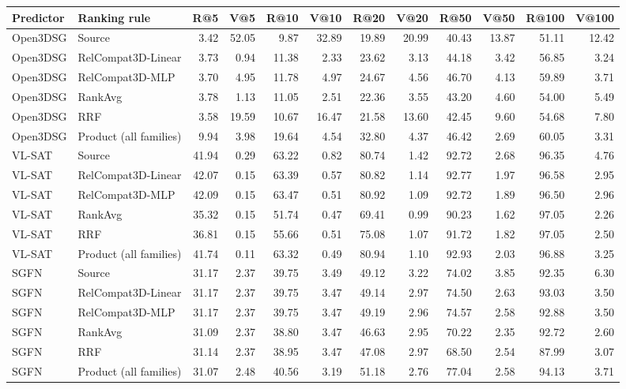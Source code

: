 \begin{tabular}{llrrrrrrrrrr}
\toprule
Predictor & Ranking rule & R@5 & V@5 & R@10 & V@10 & R@20 & V@20 & R@50 & V@50 & R@100 & V@100 \\
\midrule
Open3DSG & Source & 3.42 & 52.05 & 9.87 & 32.89 & 19.89 & 20.99 & 40.43 & 13.87 & 51.11 & 12.42 \\
Open3DSG & RelCompat3D-Linear & 3.73 & 0.94 & 11.38 & 2.33 & 23.62 & 3.13 & 44.18 & 3.42 & 56.85 & 3.24 \\
Open3DSG & RelCompat3D-MLP & 3.70 & 4.95 & 11.78 & 4.97 & 24.67 & 4.56 & 46.70 & 4.13 & 59.89 & 3.71 \\
Open3DSG & RankAvg & 3.78 & 1.13 & 11.05 & 2.51 & 22.36 & 3.55 & 43.20 & 4.60 & 54.00 & 5.49 \\
Open3DSG & RRF & 3.58 & 19.59 & 10.67 & 16.47 & 21.58 & 13.60 & 42.45 & 9.60 & 54.68 & 7.80 \\
Open3DSG & Product (all families) & 9.94 & 3.98 & 19.64 & 4.54 & 32.80 & 4.37 & 46.42 & 2.69 & 60.05 & 3.31 \\
VL-SAT & Source & 41.94 & 0.29 & 63.22 & 0.82 & 80.74 & 1.42 & 92.72 & 2.68 & 96.35 & 4.76 \\
VL-SAT & RelCompat3D-Linear & 42.07 & 0.15 & 63.39 & 0.57 & 80.82 & 1.14 & 92.77 & 1.97 & 96.58 & 2.95 \\
VL-SAT & RelCompat3D-MLP & 42.09 & 0.15 & 63.47 & 0.51 & 80.92 & 1.09 & 92.72 & 1.89 & 96.50 & 2.96 \\
VL-SAT & RankAvg & 35.32 & 0.15 & 51.74 & 0.47 & 69.41 & 0.99 & 90.23 & 1.62 & 97.05 & 2.26 \\
VL-SAT & RRF & 36.81 & 0.15 & 55.66 & 0.51 & 75.08 & 1.07 & 91.72 & 1.82 & 97.05 & 2.50 \\
VL-SAT & Product (all families) & 41.74 & 0.11 & 63.32 & 0.49 & 80.94 & 1.10 & 92.93 & 2.03 & 96.88 & 3.25 \\
SGFN & Source & 31.17 & 2.37 & 39.75 & 3.49 & 49.12 & 3.22 & 74.02 & 3.85 & 92.35 & 6.30 \\
SGFN & RelCompat3D-Linear & 31.17 & 2.37 & 39.75 & 3.47 & 49.14 & 2.97 & 74.50 & 2.63 & 93.03 & 3.50 \\
SGFN & RelCompat3D-MLP & 31.17 & 2.37 & 39.75 & 3.47 & 49.19 & 2.96 & 74.57 & 2.58 & 92.88 & 3.50 \\
SGFN & RankAvg & 31.09 & 2.37 & 38.80 & 3.47 & 46.63 & 2.95 & 70.22 & 2.35 & 92.72 & 2.60 \\
SGFN & RRF & 31.14 & 2.37 & 38.95 & 3.47 & 47.08 & 2.97 & 68.50 & 2.54 & 87.99 & 3.07 \\
SGFN & Product (all families) & 31.07 & 2.48 & 40.56 & 3.19 & 51.18 & 2.76 & 77.04 & 2.58 & 94.13 & 3.71 \\
\bottomrule
\end{tabular}

